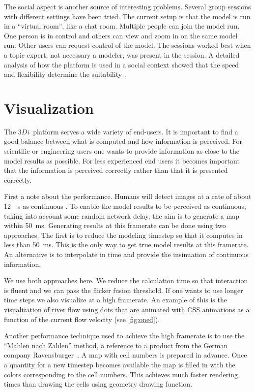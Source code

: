 \documentclass[a4paper]{article}
\DeclareRobustCommand{\threedi}{$3Di$~}
\begin{document}
The social aspect is another source of interesting problems. Several group sessions with different settings have been tried. The current setup is that the model is run in a ``virtual room'', like a chat room. Multiple people can join the model run. One person is in control and others can view and zoom in on the same model run. Other users can request control of the model. The sessions worked best when a topic expert, not necessary a modeler, was present in the session. A detailed analysis of how the platform is used in a social context showed that the speed and flexibility determine the suitability \citep{Leskens2014}.


\section{Visualization}
The \threedi platform serves a wide variety of end-users. It is important to find a good balance between what is computed and how information is perceived. For scientific or engineering users one wants to provide information as close to the model results as possible. For less experienced end users it becomes important that the information is perceived correctly rather than that it is presented correctly.

First a note about the performance. Humans will detect images at a rate of about \SI{12}{\per\second} as continuous \citep{Landis1954}. To enable the model results to be perceived as continuous, taking into account some random network delay, the aim is to generate a map within \SI{50}{\milli\second}.
Generating results at this framerate can be done using two approaches. The first is to reduce the modeling timestep so that it computes in less than \SI{50}{\milli\second}. This is the only way to get true model results at this framerate.
An alternative is to interpolate in time and provide the insinuation of continuous information.

We use both approaches here. We reduce the calculation time so that interaction is fluent and we can pass the flicker fusion threshold. If one wants to use longer time steps we also visualize at a high framerate. An example of this is the visualization of river flow using dots that are animated with \ac{CSS} animations as a function of the current flow velocity (see \autoref{fig:oned}).

Another performance technique used to achieve the high framerate is to use the ``Mahlen nach Zahlen'' method, a reference to a product from the German company Ravensburger~\textregistered. A map with cell numbers is prepared in advance. Once a quantity for a new timestep becomes available the map is filled in with the colors corresponding to the cell numbers. This achieves much faster rendering times than drawing the cells using geometry drawing function.
\end{document}
